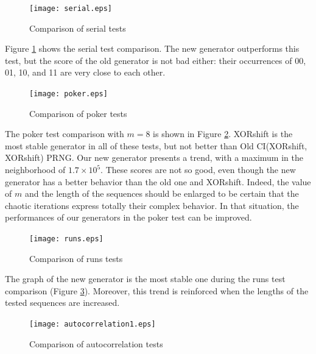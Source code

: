 \begin{figure}
\centering
\texttt{[image: serial.eps]}
\caption{Comparison of serial tests}
\label{serial}
\end{figure}

Figure \ref{serial} shows the serial test comparison. The new generator outperforms this test, but the score of the old generator is not bad either: their occurrences of 00, 01, 10, and 11 are very close to each other.%

\begin{figure}
\centering
\texttt{[image: poker.eps]}
\caption{Comparison of poker tests}
\label{poker}
\end{figure}

The poker test comparison with $m=8$ is shown in Figure \ref{poker}. XORshift is the most stable generator in all of these tests, but not better than Old CI(XORshift, XORshift) PRNG. 
Our new generator presents a trend, with a maximum in the neighborhood of $1.7 \times 10^5$. These scores are not so good, even though the new generator has a better behavior than the old one and XORshift. 
Indeed, the value of $m$ and the length of the sequences should be enlarged to be certain that the chaotic iterations express totally their complex behavior. In that situation, the performances of our generators in the poker test can be improved.

\begin{figure}
\centering
\texttt{[image: runs.eps]}
\caption{Comparison of runs tests}
\label{runs}
\end{figure}

The graph of the new generator is the most stable one during the runs test comparison (Figure \ref{runs}). Moreover, this trend is reinforced when the lengths of the tested sequences are increased.


\begin{figure}
\centering
\texttt{[image: autocorrelation1.eps]}
\caption{Comparison of autocorrelation tests}
\label{autocorrelation}
\end{figure}


